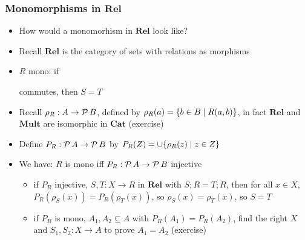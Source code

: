\documentclass[handout]{beamer}
\newcommand{\bfsf}[1]{{\boldsymbol{#1}}}
\newcommand{\Rel}{\bfsf{Rel}}
\newcommand{\Mult}{\bfsf{Mult}}
\newcommand{\Cat}{\bfsf{Cat}}
\begin{document}
\frame
  {   
    \frametitle{Monomorphisms in $\Rel$}\label{Ch4:MonosRel}

 \begin{itemize}[<+->]
\item How would a monomorhism in $\Rel$ look like?
\item Recall $\Rel$ is the category of sets with relations as morphisms
\item $R$ mono: if
commutes, then $S=T$
\item Recall  $\rho_R : A\to \operatorname{\mathcal{P}}{B}$, 
defined by $\rho_R(a) = \{b\in B\mid R(a,b)\}$,
in fact $\Rel$ and $\Mult$ are isomorphic in $\Cat$ (exercise)
\item Define $P_R : \operatorname{\mathcal{P}}{A}\to \operatorname{\mathcal{P}}{B}$ by $P_R(Z) = \cup\{\rho_R(z) \mid z\in Z\}$
\item We have: $R$ is mono iff  $P_R : \operatorname{\mathcal{P}}{A}\to \operatorname{\mathcal{P}}{B}$ injective
 \begin{itemize}
    \item if $P_R$ injective, $S,T: X\to R$ in $\Rel$ with $S;R = T;R$, 
then for all $x\in X$, $P_R(\rho_S(x)) = P_R(\rho_T(x))$, so $\rho_S(x) = \rho_T(x)$, so $S=T$
    \item if $P_R$ is mono, $A_1,A_2\subseteq A$ with $P_R(A_1)=P_R(A_2)$,
find the right $X$ and $S_1,S_2: X\to A$ to prove $A_1=A_2$ (exercise)
\end{itemize}

 \end{itemize}

 }
\end{document}
